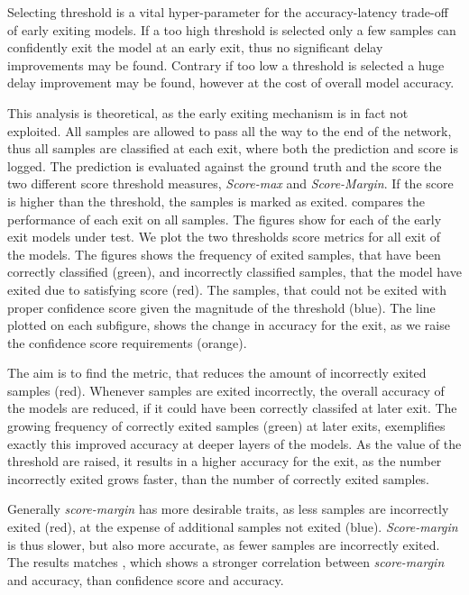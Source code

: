 Selecting threshold is a vital hyper-parameter for the accuracy-latency trade-off of early exiting models. If a too high threshold is selected only a few samples can confidently exit the model at an early exit, thus no significant delay improvements may be found. Contrary if too low a threshold is selected a huge delay improvement may be found, however at the cost of overall model accuracy. 

This analysis is theoretical, as the early exiting mechanism is in fact not exploited. All samples are allowed to pass all the way to the end of the network, thus all samples are classified at each exit, where both the prediction and score is logged. The prediction is evaluated against the ground truth and the score the two different score threshold measures, \emph{Score-max} and \emph{Score-Margin}. If the score is higher than the threshold, the samples is marked as exited.  compares the performance of each exit on all samples. The figures show for each of the early exit models under test. We plot the two thresholds score metrics for all exit of the models. The figures shows the frequency of exited samples, that have been correctly classified ({\color{sns-green}green}), and incorrectly classified samples, that the model have exited due to satisfying score ({\color{sns-red}red}). The samples, that could not be exited with proper confidence score given the magnitude of the threshold ({\color{sns-blue}blue}). The line plotted on each subfigure, shows the change in accuracy for the exit, as we raise the confidence score requirements ({\color{sns-orange}orange}).  

The aim is to find the metric, that reduces the amount of incorrectly exited samples ({\color{sns-red}red}). Whenever samples are exited incorrectly, the overall accuracy of the models are reduced, if it could have been correctly classifed at later exit. The growing frequency of correctly exited samples ({\color{sns-green}green}) at later exits, exemplifies exactly this improved accuracy at deeper layers of the models. As the value of the threshold are raised, it results in a higher accuracy for the exit, as the number incorrectly exited grows faster, than the number of correctly exited samples. 

Generally \emph{score-margin} has more desirable traits, as less samples are incorrectly exited ({\color{sns-red}red}), at the expense of additional samples not exited ({\color{sns-blue}blue}). \emph{Score-margin} is thus slower, but also more accurate, as fewer samples are incorrectly exited. The results matches \cite{park_big/little_2015}, which shows a stronger correlation between \emph{score-margin} and accuracy, than confidence score and accuracy.

